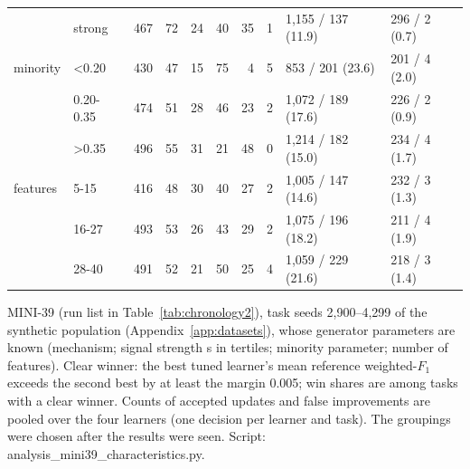 \begin{table}[!t]
\begin{tabular}{@{}llrrrrrrll@{}}
 & strong & 467 & 72 & 24 & 40 & 35 & 1 & 1,155 / 137 (11.9) & 296 / 2 (0.7) \\
minority & <0.20 & 430 & 47 & 15 & 75 & 4 & 5 & 853 / 201 (23.6) & 201 / 4 (2.0) \\
 & 0.20-0.35 & 474 & 51 & 28 & 46 & 23 & 2 & 1,072 / 189 (17.6) & 226 / 2 (0.9) \\
 & >0.35 & 496 & 55 & 31 & 21 & 48 & 0 & 1,214 / 182 (15.0) & 234 / 4 (1.7) \\
features & 5-15 & 416 & 48 & 30 & 40 & 27 & 2 & 1,005 / 147 (14.6) & 232 / 3 (1.3) \\
 & 16-27 & 493 & 53 & 26 & 43 & 29 & 2 & 1,075 / 196 (18.2) & 211 / 4 (1.9) \\
 & 28-40 & 491 & 52 & 21 & 50 & 25 & 4 & 1,059 / 229 (21.6) & 218 / 3 (1.4) \\
\bottomrule
\end{tabular}

\vspace{2pt}
\parbox{\linewidth}{\justifying\scriptsize *MINI-39 (run list in Table~\ref{tab:chronology2}), task seeds 2,900--4,299 of the synthetic population (Appendix~\ref{app:datasets}), whose generator parameters are known (mechanism; signal strength s in tertiles; minority parameter; number of features). Clear winner: the best tuned learner's mean reference weighted-$F_1$ exceeds the second best by at least the margin 0.005; win shares are among tasks with a clear winner. Counts of accepted updates and false improvements are pooled over the four learners (one decision per learner and task). The groupings were chosen after the results were seen. Script: analysis\_mini39\_characteristics.py.}
\end{table}
